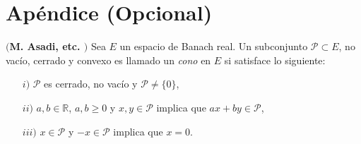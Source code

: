 \chapter*{Apéndice (Opcional)}
\label{Apendice}

\noindent \textbf{$($M. Asadi, etc. \cite{ASSOVARH2009}$)$}
Sea $E$ un espacio  de Banach real. Un subconjunto $\mathcal{P}\subset E$, no vacío, cerrado y convexo es llamado un \emph{cono} en $E$ si satisface lo siguiente:
\begin{itemize}
	\item [$i)$] $\mathcal{P}$ es cerrado, no vacío y $\mathcal{P}\neq \{0\}$,
	\item [$ii)$] $a,b\in \mathbb{R}$, $a,b\geq 0$ y $x,y\in \mathcal{P}$ implica que $a x+ b y \in \mathcal{P}$,
	\item [$iii)$] $x\in \mathcal{P}$ y $-x\in \mathcal{P}$ implica que $x=0$.
\end{itemize}


